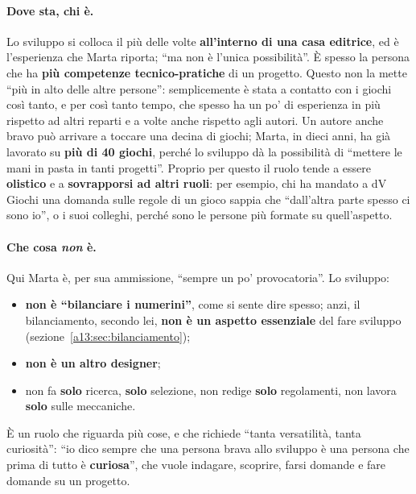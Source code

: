 \paragraph{Dove sta, chi è.} Lo sviluppo si colloca il più delle volte \textbf{all'interno
di una casa editrice}, ed è l'esperienza che Marta riporta; ``ma non è l'unica
possibilità''. È spesso la persona che ha \textbf{più competenze tecnico-pratiche} di un
progetto. Questo non la mette ``più in alto delle altre persone'': semplicemente è stata
a contatto con i giochi così tanto, e per così tanto tempo, che spesso ha un po' di
esperienza in più rispetto ad altri reparti e a volte anche rispetto agli autori. Un
autore anche bravo può arrivare a toccare una decina di giochi; Marta, in dieci anni, ha
già lavorato su \textbf{più di 40 giochi}, perché lo sviluppo dà la possibilità di
``mettere le mani in pasta in tanti progetti''. Proprio per questo il ruolo tende a
essere \textbf{olistico} e a \textbf{sovrapporsi ad altri ruoli}: per esempio, chi ha
mandato a dV Giochi una domanda sulle regole di un gioco sappia che ``dall'altra parte
spesso ci sono io'', o i suoi colleghi, perché sono le persone più formate su quell'aspetto.

\paragraph{Che cosa \emph{non} è.} Qui Marta è, per sua ammissione, ``sempre un po'
provocatoria''. Lo sviluppo:
\begin{itemize}
  \item \textbf{non è ``bilanciare i numerini''}, come si sente dire spesso; anzi, il
        bilanciamento, secondo lei, \textbf{non è un aspetto essenziale} del fare
        sviluppo (sezione~\ref{a13:sec:bilanciamento});
  \item \textbf{non è un altro designer};
  \item non fa \textbf{solo} ricerca, \textbf{solo} selezione, non redige \textbf{solo}
        regolamenti, non lavora \textbf{solo} sulle meccaniche.
\end{itemize}
È un ruolo che riguarda più cose, e che richiede ``tanta versatilità, tanta curiosità'':
``io dico sempre che una persona brava allo sviluppo è una persona che prima di tutto è
\textbf{curiosa}'', che vuole indagare, scoprire, farsi domande e fare domande su un
progetto.

